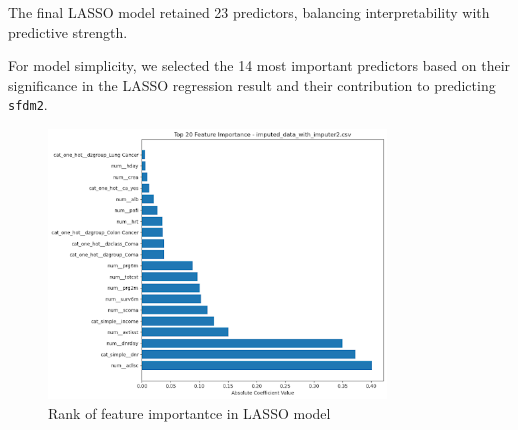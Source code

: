The final LASSO model retained 23 predictors, balancing interpretability with predictive strength.

For model simplicity, we selected the 14 most important predictors based 
on their significance in the LASSO regression result and their contribution to predicting \texttt{sfdm2}.

\begin{figure}[!h]
\centering
\includegraphics[width=0.8\textwidth]{../results/feature_selected_Lasso.png}
\caption{Rank of feature importantce in LASSO model}
\label{fig:feature_importance}
\end{figure}